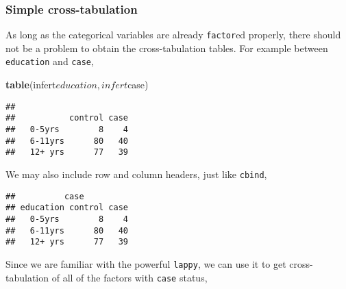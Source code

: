 \documentclass[]{book}
\newenvironment{Shaded}{\begin{snugshade}}{\end{snugshade}}
\newcommand{\KeywordTok}[1]{\textcolor[rgb]{0.13,0.29,0.53}{\textbf{{#1}}}}
\newcommand{\DataTypeTok}[1]{\textcolor[rgb]{0.13,0.29,0.53}{{#1}}}
\newcommand{\StringTok}[1]{\textcolor[rgb]{0.31,0.60,0.02}{{#1}}}
\newcommand{\NormalTok}[1]{{#1}}
\theoremstyle{definition}
\theoremstyle{definition}
\theoremstyle{remark}
\begin{document}
\subsubsection{Simple cross-tabulation}\label{simple-cross-tabulation}

As long as the categorical variables are already \texttt{factor}ed
properly, there should not be a problem to obtain the cross-tabulation
tables. For example between \texttt{education} and \texttt{case},

\begin{Shaded}
\begin{Highlighting}[]
\KeywordTok{table}\NormalTok{(infert$education, infert$case)}
\end{Highlighting}
\end{Shaded}

\begin{verbatim}
##          
##           control case
##   0-5yrs        8    4
##   6-11yrs      80   40
##   12+ yrs      77   39
\end{verbatim}

We may also include row and column headers, just like \texttt{cbind},

\begin{Shaded}
\end{Shaded}

\begin{verbatim}
##          case
## education control case
##   0-5yrs        8    4
##   6-11yrs      80   40
##   12+ yrs      77   39
\end{verbatim}

Since we are familiar with the powerful \texttt{lappy}, we can use it to
get cross-tabulation of all of the factors with \texttt{case} status,

\begin{Shaded}
\end{Shaded}
\end{document}
